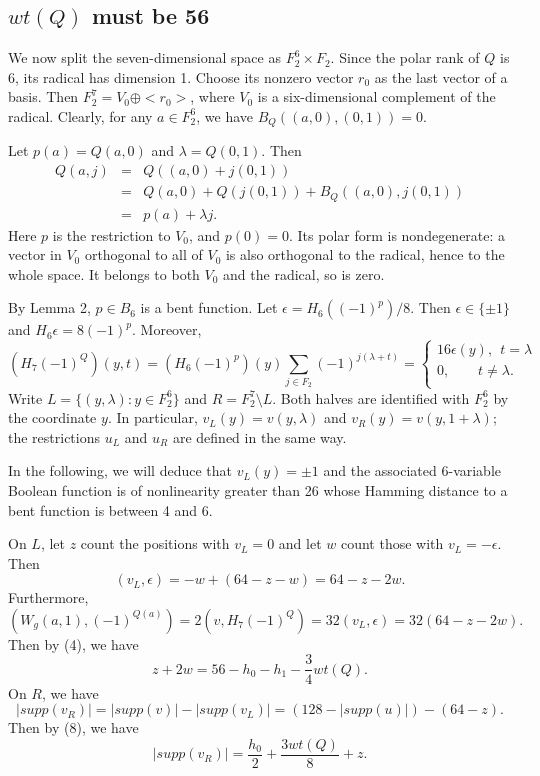 \documentclass[11pt]{article}
\newtheorem{open problem}{Open problem}
\begin{document}
\subsection{$wt(Q)$ must be 56}

We now  split the seven-dimensional space as $F_2^6\times F_2$. Since the polar rank of $Q$ is 6, its radical has dimension 1.  Choose its nonzero vector $r_0$ as the last vector of a basis. Then $F_2^7=V_0\oplus <r_0> $, where $V_0$  is  a six-dimensional complement of the radical. Clearly, for any $a\in F_2^6$, we have $B_Q((a,0),(0,1))=0$.

Let $p(a)=Q(a,0)$ and $\lambda=Q(0,1)$. Then
\begin{eqnarray*}
Q(a,j)&=&Q((a,0)+j(0,1))\\
&=& Q(a,0)+Q(j(0,1))+B_Q((a,0),j(0,1))\\
&=&p(a)+\lambda j.
\end{eqnarray*}
Here  $p$  is the restriction to $V_0$, and $p(0)=0$.  Its polar
form is nondegenerate: a vector in $V_0$ orthogonal to all of $V_0$ is also orthogonal to the radical, hence
to the whole space. It belongs to both $V_0$ and the radical, so is zero.

By Lemma 2, $p\in B_6$ is a bent function. Let $\epsilon=H_6((-1)^p)/8$.  Then $\epsilon\in\{\pm 1\}$ and $H_6 \epsilon=8(-1)^p $. Moreover,
\[
(H_7(-1)^Q)(y,t)=(H_6(-1)^p)(y)\sum_{j\in F_2}(-1)^{j(\lambda+t)}=\left \{ \begin{array} {l} 16\epsilon(y), \  \ t=\lambda \\
  0, \ \ \ \ \ \ \ \ \ t\neq \lambda . \\
\end{array} \right.
\]
Write $L=\{(y,\lambda):y\in F_2^6\}$ and $R=F_2^7\setminus L$. Both halves are identified with $F_2^6$ by the coordinate $y$.  In particular, $v_L(y)=v(y,\lambda)$ and $v_R(y)=v(y,1+\lambda)$; the restrictions $u_L$ and $u_R$ are defined in the
same way.

In the following, we will deduce that $v_L(y)=\pm 1$ and the associated 6-variable Boolean function is of nonlinearity greater than 26 whose Hamming distance to a bent function is between 4 and 6.

On $L$, let $z$  count the positions with $v_L=0$ and let $w$  count those with $ v_L=-\epsilon$. Then
\[
(v_L,\epsilon)=-w+(64-z-w)=64-z-2w.
\]
Furthermore,
\[
(W_g(a,1), (-1)^{Q(a)})=2(v,H_7(-1)^Q)=32(v_L,\epsilon)=32(64-z-2w).
\]
Then by (4), we have
\begin{equation}
z+2w=56-h_0-h_1-\frac{3}{4}wt(Q).
\end{equation}
On $R$, we have
\[
|supp(v_R)|=|supp(v)|-|supp(v_L)|=(128-|supp(u)|)-(64-z).
\]
Then by (8), we have
\begin{equation}
|supp(v_R)|=\frac{h_0}{2}+\frac{3wt(Q)}{8}+z.
\end{equation}
\end{document}
